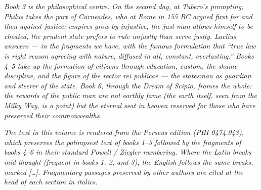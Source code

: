 \textit{Book 3 is the philosophical centre. On the second
day, at Tubero's prompting, Philus takes the part of
Carneades, who at Rome in 155 BC argued first for and then
against justice: empires grow by injustice, the just man
allows himself to be cheated, the prudent state prefers to
rule unjustly than serve justly. Laelius answers --- in the
fragments we have, with the famous formulation that ``true
law is right reason agreeing with nature, diffused in all,
constant, everlasting.'' Books 4--5 take up the formation
of citizens through education, custom, the shame-discipline,
and the figure of the \textit{rector rei publicae} --- the
statesman as guardian and steerer of the state. Book 6,
through the Dream of Scipio, frames the whole: the rewards
of the public man are not earthly fame (the earth itself,
seen from the Milky Way, is a point) but the eternal seat
in heaven reserved for those who have preserved their
commonwealths.}

\textit{The text in this volume is rendered from the
Perseus edition (PHI 0474.043), which preserves the
palimpsest text of books 1--3 followed by the fragments of
books 4--6 in their standard Powell / Ziegler numbering.
Where the Latin breaks mid-thought (frequent in books 1, 2,
and 3), the English follows the same breaks, marked
\textit{[\ldots]}. Fragmentary passages preserved by other
authors are cited at the head of each section in italics.}
